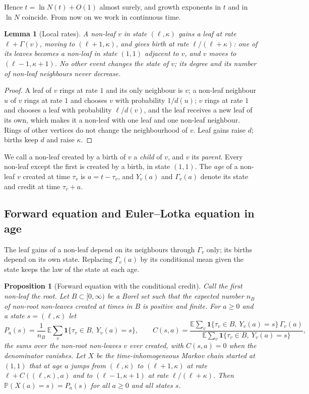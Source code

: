 \documentclass[11pt]{article}
\theoremstyle{plain}
\newtheorem{lemma}[theorem]{Lemma}
\newtheorem{proposition}[theorem]{Proposition}
\theoremstyle{definition}
\theoremstyle{remark}
\begin{document}
Hence $t=\ln N(t)+O(1)$ almost surely, and growth exponents in $t$ and in $\ln N$ coincide. From now on we work in continuous time.

\begin{lemma}[Local rates]\label{lem:local}
A non-leaf $v$ in state $(\ell,\kappa)$ gains a leaf at rate $\ell+\Gamma(v)$, moving to $(\ell+1,\kappa)$, and gives birth at rate $\ell/(\ell+\kappa)$: one of its leaves becomes a non-leaf in state $(1,1)$ adjacent to $v$, and $v$ moves to $(\ell-1,\kappa+1)$. No other event changes the state of $v$; its degree and its number of non-leaf neighbours never decrease.
\end{lemma}

\begin{proof}
A leaf of $v$ rings at rate $1$ and its only neighbour is $v$; a non-leaf neighbour $u$ of $v$ rings at rate $1$ and chooses $v$ with probability $1/d(u)$; $v$ rings at rate $1$ and chooses a leaf with probability $\ell/d(v)$, and the leaf receives a new leaf of its own, which makes it a non-leaf with one leaf and one non-leaf neighbour. Rings of other vertices do not change the neighbourhood of $v$. Leaf gains raise $d$; births keep $d$ and raise $\kappa$.
\end{proof}

We call a non-leaf created by a birth of $v$ a \emph{child} of $v$, and $v$ its \emph{parent}. Every non-leaf except the first is created by a birth, in state $(1,1)$. The \emph{age} of a non-leaf $v$ created at time $\tau_v$ is $a=t-\tau_v$, and $Y_v(a)$ and $\Gamma_v(a)$ denote its state and credit at time $\tau_v+a$.

\subsection{Forward equation and Euler--Lotka equation in age}

The leaf gains of a non-leaf depend on its neighbours through $\Gamma_v$ only; its births depend on its own state. Replacing $\Gamma_v(a)$ by its conditional mean given the state keeps the law of the state at each age.

\begin{proposition}[Forward equation with the conditional credit]\label{prop:forward}
Call the first non-leaf the \emph{root}. Let $B\subset[0,\infty)$ be a Borel set such that the expected number $n_B$ of non-root non-leaves created at times in $B$ is positive and finite. For $a\ge0$ and a state $s=(\ell,\kappa)$ let
\[
P_a(s)=\frac1{n_B}\,\mathbb E\sum_v\mathbf 1\{\tau_v\in B,\ Y_v(a)=s\},\qquad
C(s,a)=\frac{\mathbb E\sum_v\mathbf 1\{\tau_v\in B,\ Y_v(a)=s\}\,\Gamma_v(a)}{\mathbb E\sum_v\mathbf 1\{\tau_v\in B,\ Y_v(a)=s\}},
\]
the sums over the non-root non-leaves $v$ ever created, with $C(s,a)=0$ when the denominator vanishes. Let $X$ be the time-inhomogeneous Markov chain started at $(1,1)$ that at age $a$ jumps from $(\ell,\kappa)$ to $(\ell+1,\kappa)$ at rate $\ell+C((\ell,\kappa),a)$ and to $(\ell-1,\kappa+1)$ at rate $\ell/(\ell+\kappa)$. Then $\mathbb P(X(a)=s)=P_a(s)$ for all $a\ge0$ and all states $s$.
\end{proposition}
\end{document}
